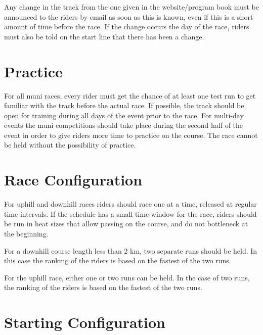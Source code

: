 Any change in the track from the one given in the website/program book must be announced to the riders by email as soon as this is known, even if this is a short amount of time before the race.
If the change occurs the day of the race, riders must also be told on the start line that there has been a change.

\section{Practice}

For all muni races, every rider must get the chance of at least one test run to get familiar with the track before the actual race.
If possible, the track should be open for training during all days of the event prior to the race.
For multi-day events the muni competitions should take place during the second half of the event in order to give riders more time to practice on the course.
The race cannot be held without the possibility of practice.

\section{Race Configuration}

For uphill and downhill races riders should race one at a time, released at regular time intervals.
If the schedule has a small time window for the race, riders should be run in heat sizes that allow passing on the course, and do not bottleneck at the beginning.

For a downhill course length less than 2 km, two separate runs should be held.
In this case the ranking of the riders is based on the fastest of the two runs.

For the uphill race, either one or two runs can be held.
In the case of two runs, the ranking of the riders is based on the fastest of the two runs.

\section{Starting Configuration  \label{sec:muni_starting-configuration}}


